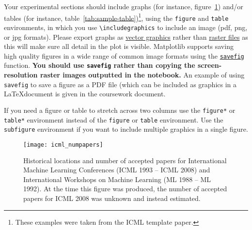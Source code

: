 \documentclass{article}
\begin{document}
Your experimental sections should include graphs (for instance, figure~\ref{fig:sample-graph}) and/or tables (for instance, table~\ref{tab:sample-table})\footnote{These examples were taken from the ICML template paper.}, using the \verb+figure+ and \verb+table+ environments, in which you use \verb+\includegraphics+ to include an image (pdf, png, or jpg formats).  Please export graphs as 
\href{https://en.wikipedia.org/wiki/Vector_graphics}{vector graphics}
rather than \href{https://en.wikipedia.org/wiki/Raster_graphics}{raster
files} as this will make sure all detail in the plot is visible.
Matplotlib supports saving high quality figures in a wide range of
common image formats using the
\href{http://matplotlib.org/api/pyplot_api.html\#matplotlib.pyplot.savefig}{\texttt{savefig}}
function. \textbf{You should use \texttt{savefig} rather than copying
the screen-resolution raster images outputted in the notebook.} An
example of using \texttt{savefig} to save a figure as a PDF file (which
can be included as graphics in a \LaTeX document is given in the coursework document.

If you need a figure or table to stretch across two columns use the \verb+figure*+ or \verb+table*+ environment instead of the \verb+figure+ or \verb+table+ environment.  Use the \verb+subfigure+ environment if you want to include multiple graphics in a single figure.

\begin{figure}[tb]
\vskip 5mm
\begin{center}
\centerline{\texttt{[image: icml\_numpapers]}}
\caption{Historical locations and number of accepted papers for International
  Machine Learning Conferences (ICML 1993 -- ICML 2008) and
  International Workshops on Machine Learning (ML 1988 -- ML
  1992). At the time this figure was produced, the number of
  accepted papers for ICML 2008 was unknown and instead estimated.}
\label{fig:sample-graph}
\end{center}
\vskip -5mm
\end{figure} 
\end{document}
